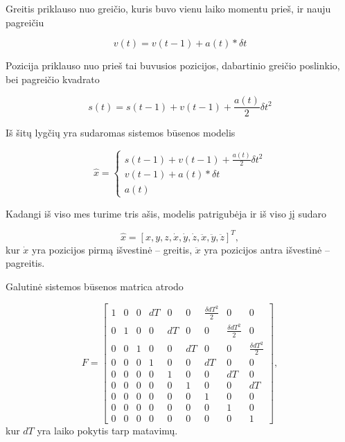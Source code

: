 Greitis priklauso nuo greičio, kuris buvo vienu laiko momentu prieš, ir nauju pagreičiu

\begin{equation}
    v(t) = v(t-1) + a(t) * \delta t
\end{equation}

Pozicija priklauso nuo prieš tai buvusios pozicijos, dabartinio greičio poslinkio, bei pagreičio kvadrato

\begin{equation}
    s(t) = s(t-1) + v(t-1) + \frac{a(t)}{2}\delta t^2
\end{equation}

Iš šitų lygčių yra sudaromas sistemos būsenos modelis

\begin{equation}
    \hat{x} = \begin{cases}
        s(t-1) + v(t-1) + \frac{a(t)}{2}\delta t^2 \\
        v(t-1) + a(t) * \delta t \\
        a(t)
    \end{cases}
\end{equation}

Kadangi iš viso mes turime tris ašis, modelis patrigubėja ir iš viso jį sudaro

\begin{equation}
    \hat{x} = [ x, y, z, \dot{x}, \dot{y}, \dot{z}, \ddot{x}, \ddot{y}, \ddot{z}]^T,
\end{equation}
kur $\dot{x}$ yra pozicijos pirmą išvestinė -- greitis, $\ddot{x}$ yra pozicijos antra išvestinė -- pagreitis.

Galutinė sistemos būsenos matrica atrodo

\begin{equation}
    F = \begin{bmatrix}
        1 & 0 & 0 & dT & 0 & 0 & \frac{\delta dT^2}{2} & 0 & 0 \\
        0 & 1 & 0 & 0 & dT & 0 & 0 & \frac{\delta dT^2}{2} & 0 \\
        0 & 0 & 1 & 0 & 0 & dT & 0 & 0 & \frac{\delta dT^2}{2} \\
        0 & 0 & 0 & 1 & 0 & 0 & dT & 0 & 0 \\
        0 & 0 & 0 & 0 & 1 & 0 & 0 & dT & 0 \\
        0 & 0 & 0 & 0 & 0 & 1 & 0 & 0 & dT \\
        0 & 0 & 0 & 0 & 0 & 0 & 1 & 0 & 0 \\
        0 & 0 & 0 & 0 & 0 & 0 & 0 & 1 & 0 \\
        0 & 0 & 0 & 0 & 0 & 0 & 0 & 0 & 1
    \end{bmatrix},
\end{equation}
kur $dT$ yra laiko pokytis tarp matavimų.

